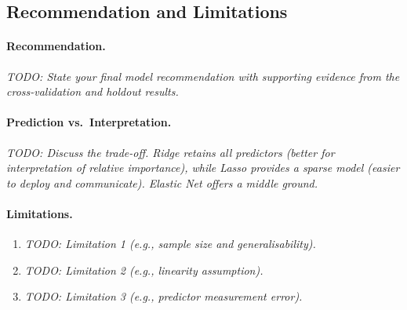 
\subsection{Recommendation and Limitations}
\label{sec:recommendation}


\paragraph{Recommendation.}
\textit{TODO: State your final model recommendation with supporting evidence
from the cross-validation and holdout results.}

\paragraph{Prediction vs.\ Interpretation.}
\textit{TODO: Discuss the trade-off. Ridge retains all predictors (better for
interpretation of relative importance), while Lasso provides a sparse model
(easier to deploy and communicate). Elastic Net offers a middle ground.}

\paragraph{Limitations.}
\begin{enumerate}
    \item \textit{TODO: Limitation 1 (e.g., sample size and generalisability).}
    \item \textit{TODO: Limitation 2 (e.g., linearity assumption).}
    \item \textit{TODO: Limitation 3 (e.g., predictor measurement error).}
\end{enumerate}

